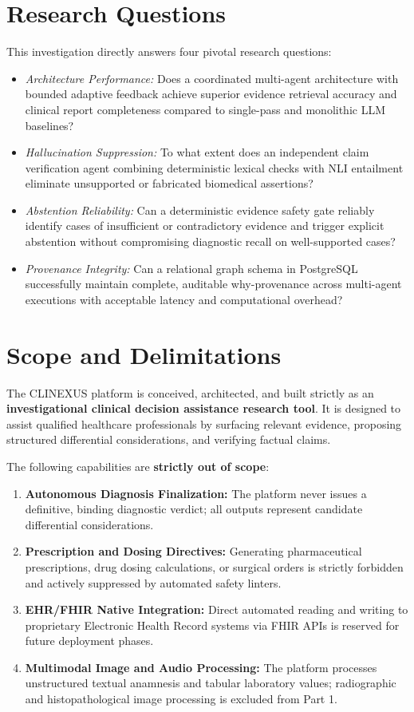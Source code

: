 \documentclass[12pt,a4paper]{report}
\begin{document}
\section{Research Questions}
This investigation directly answers four pivotal research questions:
\begin{itemize}
    \item[\textbf{RQ1:}] \textit{Architecture Performance:} Does a coordinated multi-agent architecture with bounded adaptive feedback achieve superior evidence retrieval accuracy and clinical report completeness compared to single-pass and monolithic LLM baselines?
    \item[\textbf{RQ2:}] \textit{Hallucination Suppression:} To what extent does an independent claim verification agent combining deterministic lexical checks with NLI entailment eliminate unsupported or fabricated biomedical assertions?
    \item[\textbf{RQ3:}] \textit{Abstention Reliability:} Can a deterministic evidence safety gate reliably identify cases of insufficient or contradictory evidence and trigger explicit abstention without compromising diagnostic recall on well-supported cases?
    \item[\textbf{RQ4:}] \textit{Provenance Integrity:} Can a relational graph schema in PostgreSQL successfully maintain complete, auditable why-provenance across multi-agent executions with acceptable latency and computational overhead?
\end{itemize}

\section{Scope and Delimitations}
The CLINEXUS platform is conceived, architected, and built strictly as an \textbf{investigational clinical decision assistance research tool}. It is designed to assist qualified healthcare professionals by surfacing relevant evidence, proposing structured differential considerations, and verifying factual claims.

The following capabilities are \textbf{strictly out of scope}:
\begin{enumerate}
    \item \textbf{Autonomous Diagnosis Finalization:} The platform never issues a definitive, binding diagnostic verdict; all outputs represent candidate differential considerations.
    \item \textbf{Prescription and Dosing Directives:} Generating pharmaceutical prescriptions, drug dosing calculations, or surgical orders is strictly forbidden and actively suppressed by automated safety linters.
    \item \textbf{EHR/FHIR Native Integration:} Direct automated reading and writing to proprietary Electronic Health Record systems via FHIR APIs is reserved for future deployment phases.
    \item \textbf{Multimodal Image and Audio Processing:} The platform processes unstructured textual anamnesis and tabular laboratory values; radiographic and histopathological image processing is excluded from Part 1.
\end{enumerate}
\end{document}
